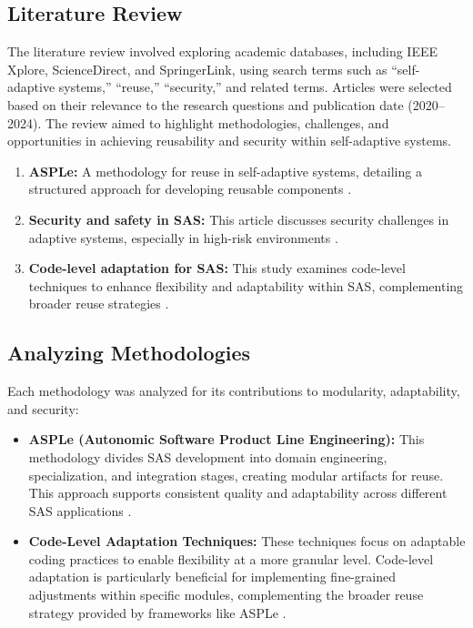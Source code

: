 \documentclass[a4paper,10pt]{article}
\begin{document}
\subsection{Literature Review}

The literature review involved exploring academic databases, including IEEE Xplore, ScienceDirect, and SpringerLink, using search terms such as “self-adaptive systems,” “reuse,” “security,” and related terms. Articles were selected based on their relevance to the research questions and publication date (2020–2024). The review aimed to highlight methodologies, challenges, and opportunities in achieving reusability and security within self-adaptive systems.

\begin{enumerate}
    \item \textbf{ASPLe:} A methodology for reuse in self-adaptive systems, detailing a structured approach for developing reusable components \cite{Nadeem2020}.
    
    \item \textbf{Security and safety in SAS:} This article discusses security challenges in adaptive systems, especially in high-risk environments \cite{Pekaric2023}.
    
    \item \textbf{Code-level adaptation for SAS:} This study examines code-level techniques to enhance flexibility and adaptability within SAS, complementing broader reuse strategies \cite{Korra2022}.
\end{enumerate}

\subsection{Analyzing Methodologies}

Each methodology was analyzed for its contributions to modularity, adaptability, and security:

\begin{itemize}
    \item \textbf{ASPLe (Autonomic Software Product Line Engineering):} This methodology divides SAS development into domain engineering, specialization, and integration stages, creating modular artifacts for reuse. This approach supports consistent quality and adaptability across different SAS applications \cite{Nadeem2020}.
    
    \item \textbf{Code-Level Adaptation Techniques:} These techniques focus on adaptable coding practices to enable flexibility at a more granular level. Code-level adaptation is particularly beneficial for implementing fine-grained adjustments within specific modules, complementing the broader reuse strategy provided by frameworks like ASPLe \cite{Korra2022}.
\end{itemize}
\end{document}
